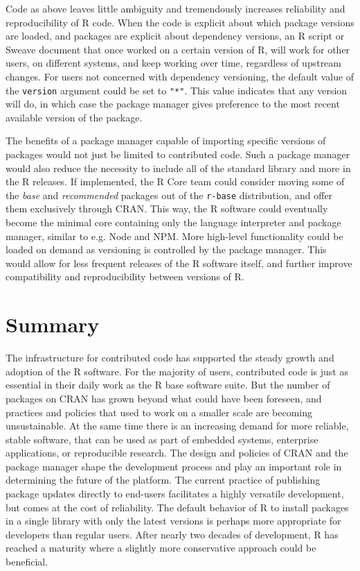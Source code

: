 Code as above leaves little ambiguity and tremendously increases reliability
and reproducibility of R code. When the code is explicit about which package
versions are loaded, and packages are explicit about dependency versions, an R
script or Sweave document that once worked on a certain version of R, will work
for other users, on different systems, and keep working over time, regardless
of upstream changes. For users not concerned with dependency versioning, the
default value of the \texttt{version} argument could be set to \texttt{"*"}.
This value indicates that any version will do, in which case the package
manager gives preference to the most recent available version of the package.

The benefits of a package manager capable of importing specific versions of
packages would not just be limited to contributed code. Such a package
manager would also reduce the necessity to include all of the standard library
and more in the R releases. If implemented, the R Core team could consider
moving some of the \emph{base} and \emph{recommended} packages out of the
\texttt{r-base} distribution, and offer them exclusively through CRAN. This
way, the R software could eventually become the minimal core containing only
the language interpreter and package manager, similar to e.g. Node and NPM.
More high-level functionality could be loaded on demand as versioning is
controlled by the package manager. This would allow for less frequent releases
of the R software itself, and further improve compatibility and reproducibility
between versions of R.

\section{Summary}

The infrastructure for contributed code has supported the steady growth and
adoption of the R software. For the majority of users, contributed code is just
as essential in their daily work as the R base software suite. But the number
of packages on CRAN has grown beyond what could have been foreseen, and
practices and policies that used to work on a smaller scale are becoming
unsustainable. At the same time there is an increasing demand for more
reliable, stable software, that can be used as part of embedded systems,
enterprise applications, or reproducible research. The design and policies of
CRAN and the package manager shape the development process and play an
important role in determining the future of the platform. The current practice
of publishing package updates directly to end-users facilitates a highly
versatile development, but comes at the cost of reliability. The default
behavior of R to install packages in a single library with only the latest
versions is perhaps more appropriate for developers than regular users. After
nearly two decades of development, R has reached a maturity where a slightly
more conservative approach could be beneficial.

